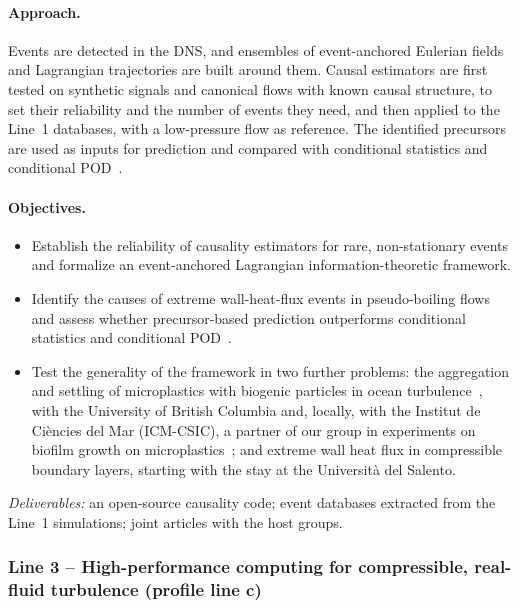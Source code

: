\documentclass[11pt]{article}
\begin{document}
\paragraph{Approach.} Events are detected in the DNS, and ensembles of event-anchored Eulerian
fields and Lagrangian trajectories are built around them. Causal estimators are first tested on
synthetic signals and canonical flows with known causal structure, to set their reliability and
the number of events they need, and then applied to the Line~1 databases, with a low-pressure
flow as reference. The identified precursors are used as inputs for prediction and compared
with conditional statistics and conditional POD~\cite{Martin2025}.
\paragraph{Objectives.}
\begin{itemize}
  \item[\textbf{O4.}] Establish the reliability of causality estimators for rare,
  non-stationary events and formalize an event-anchored Lagrangian information-theoretic
  framework.
  \item[\textbf{O5.}] Identify the causes of extreme wall-heat-flux events in pseudo-boiling
  flows and assess whether precursor-based prediction outperforms conditional statistics and
  conditional POD~\cite{Martin2025}.
  \item[\textbf{O6.}] Test the generality of the framework in two further problems: the
  aggregation and settling of microplastics with biogenic particles in ocean
  turbulence~\cite{Rahmani2022,Pizzi2024,Pizzi2026}, with the University of British Columbia and,
  locally, with the Institut de Ci\`encies del Mar (ICM-CSIC), a partner of our group in
  experiments on biofilm growth on microplastics~\cite{Pizzi2025}; and extreme wall heat flux in
  compressible boundary layers, starting with the stay at the Universit\`a del Salento.
\end{itemize}
\emph{Deliverables:} an open-source causality code; event databases extracted from the Line~1
simulations; joint articles with the host groups.

\subsubsection*{Line 3 -- High-performance computing for compressible, real-fluid
turbulence (profile line c)}
\end{document}
